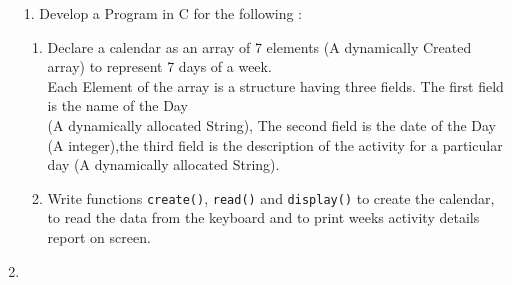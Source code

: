 \documentclass{article}
\newcommand{\answer}{\item [$\rightarrow$]}
\begin{document}
	\begin{enumerate}
		\item [1.] Develop a Program in C for the following :
		\begin{enumerate}[label=\alph*.]
			\item Declare a calendar as an array of 7 elements (A dynamically Created array) to represent 7 days of a week. \\
			Each Element of the array is a structure having three
			fields. The first field is the name of the Day \\
			(A dynamically allocated String),
			The second field is the date of the Day (A integer),the third field is the
			description of the activity for a particular day (A dynamically allocated String).
			\item Write functions \verb|create()|, \verb|read()| and \verb|display()| to create the calendar, to read the data from the keyboard and to print weeks activity  details report on screen.
		\end{enumerate}

		\answer \inputminted{c}{../Program1.c}
	\end{enumerate}
\end{document}
